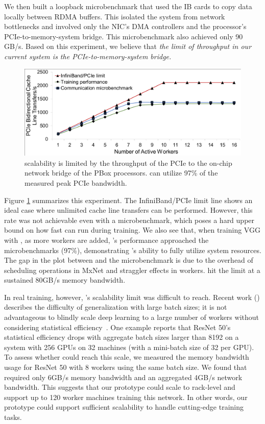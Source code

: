We then built a loopback microbenchmark that used the IB cards to copy data locally between RDMA buffers. This isolated the system from network bottlenecks and involved only the NIC's DMA controllers and the processor's PCIe-to-memory-system bridge. This microbenchmark also achieved only 90 GB/s. Based on this experiment, we believe that \textit{the limit of throughput in our current \phub system is the PCIe-to-memory-system bridge.}

\begin{figure}[t!]
    \centering
	\includegraphics[width=.6\linewidth,trim=3 2 2 2,clip]{Figures/Scalability.pdf}
	\caption{\pbox{} scalability is limited by the throughput of the PCIe to the on-chip network bridge of the PBox processors. \phub{} can utilize 97\% of the measured peak PCIe bandwidth.}
	\label{fig:scalablity}
\end{figure}

Figure \ref{fig:scalablity} summarizes this experiment. The InfiniBand/PCIe limit line shows an ideal case where unlimited cache line transfers can be performed. However, this rate was not achievable even with a microbenchmark, which poses a hard upper bound on how fast \phub can run during training. We also see that, when training VGG with , as more workers are added, \pbox{}'s performance approached the microbenchmarks (97\%), demonstrating \phub{}'s ability to fully utilize system resources. The gap in the plot between \pbox and the microbenchmark %
is due to the overhead of scheduling operations in MxNet and straggler effects in workers. \pbox{} hit the limit at a sustained 80GB/s memory bandwidth.

In real training, however, \pbox{}'s scalability limit was difficult to reach. Recent work (\cite{keskar2016large, lecun1524efficient}) describes the difficulty of generalization with large batch sizes; it is not advantageous to blindly scale deep learning to a large number of workers without considering statistical efficiency~\cite{youspeeding, koliousiscrossbow}. One example \cite{ImageNetIn1Hour} reports that ResNet 50's statistical efficiency drops with aggregate batch sizes larger than 8192 on a system with 256 GPUs on 32 machines (with a mini-batch size of 32 per GPU). To assess whether \pbox could reach this scale, we measured the memory bandwidth usage for ResNet 50 with 8 workers using the same batch size. We found that \pbox required only 6GB/s memory bandwidth and an aggregated 4GB/s network bandwidth. This suggests that our \pbox prototype could scale to rack-level and support up to 120 worker machines training this network. In other words, our prototype could support sufficient scalability to handle cutting-edge training tasks.

